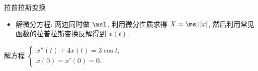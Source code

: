 \documentclass[aspectratio=169,handout]{ctexbeamer}
\begin{document}
\begin{frame}{拉普拉斯变换}
\begin{itemize}
\item 解微分方程: 两边同时做 $\msl$, 利用微分性质求得 $X=\msl[x]$, 然后利用常见函数的拉普拉斯变换反解得到 $x(t)$.
\end{itemize}
\onslide<+->
\begin{exercise}
解方程 
	$\begin{cases}
		x''(t)+4x(t)=3\cos t,& \\
		x(0)=x'(0)=0.&
	\end{cases}$
\end{exercise}
\end{frame}
\end{document}
